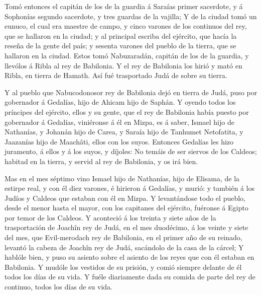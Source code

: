  Tomó entonces el capitán de los de la guardia á Saraías
primer sacerdote, y á Sophonías segundo sacerdote, y tres guardas de la
vajilla;  Y de la ciudad tomó un eunuco, el cual era
maestre de campo, y cinco varones de los continuos del rey, que se
hallaron en la ciudad; y al principal escriba del ejército, que hacía la
reseña de la gente del país; y sesenta varones del pueblo de la tierra,
que se hallaron en la ciudad.  Estos tomó Nabuzaradán,
capitán de los de la guardia, y llevólos á Ribla al rey de Babilonia.
 Y el rey de Babilonia los hirió y mató en Ribla, en tierra
de Hamath. Así fué trasportado Judá de sobre su tierra.

 Y al pueblo que Nabucodonosor rey de Babilonia dejó en
tierra de Judá, puso por gobernador á Gedalías, hijo de Ahicam hijo de
Saphán.  Y oyendo todos los príncipes del ejército, ellos y
su gente, que el rey de Babilonia había puesto por gobernador á
Gedalías, viniéronse á él en Mizpa, es á saber, Ismael hijo de
Nathanías, y Johanán hijo de Carea, y Saraía hijo de Tanhumet
Netofatita, y Jaazanías hijo de Maachâti, ellos con los suyos.
 Entonces Gedalías les hizo juramento, á ellos y á los
suyos, y díjoles: No temáis de ser siervos de los Caldeos; habitad en la
tierra, y servid al rey de Babilonia, y os irá bien.

 Mas en el mes séptimo vino Ismael hijo de Nathanías, hijo
de Elisama, de la estirpe real, y con él diez varones, é hirieron á
Gedalías, y murió: y también á los Judíos y Caldeos que estaban con él
en Mizpa.  Y levantándose todo el pueblo, desde el menor
hasta el mayor, con los capitanes del ejército, fuéronse á Egipto por
temor de los Caldeos.  Y aconteció á los treinta y siete
años de la trasportación de Joachîn rey de Judá, en el mes duodécimo, á
los veinte y siete del mes, que Evil-merodach rey de Babilonia, en el
primer año de su reinado, levantó la cabeza de Joachîn rey de Judá,
sacándolo de la casa de la cárcel;  Y hablóle bien, y puso
su asiento sobre el asiento de los reyes que con él estaban en
Babilonia.  Y mudóle los vestidos de su prisión, y comió
siempre delante de él todos los días de su vida.  Y fuéle
diariamente dada su comida de parte del rey de continuo, todos los días
de su vida.
